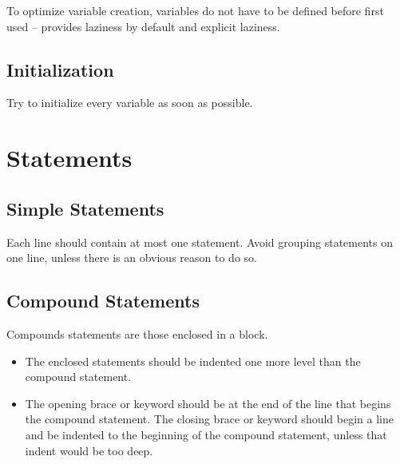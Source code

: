 To optimize variable creation, variables do not have to be defined before first used -- \Aml provides laziness by default and explicit laziness.





\subsection{Initialization}

Try to initialize every variable as soon as possible. 





\section{Statements}






\subsection{Simple Statements}

Each line should contain at most one statement. Avoid grouping statements on one line, unless there is an obvious reason to do so. 





\subsection{Compound Statements}

Compounds statements are those enclosed in a block. 
\begin{itemize}
  \item The enclosed statements should be indented one more level than the compound statement. 
  \item The opening brace or keyword should be at the end of the line that begins the compound statement. The closing brace or keyword should begin a line and be indented to the beginning of the compound statement, unless that indent would be too deep. 
\end{itemize}














